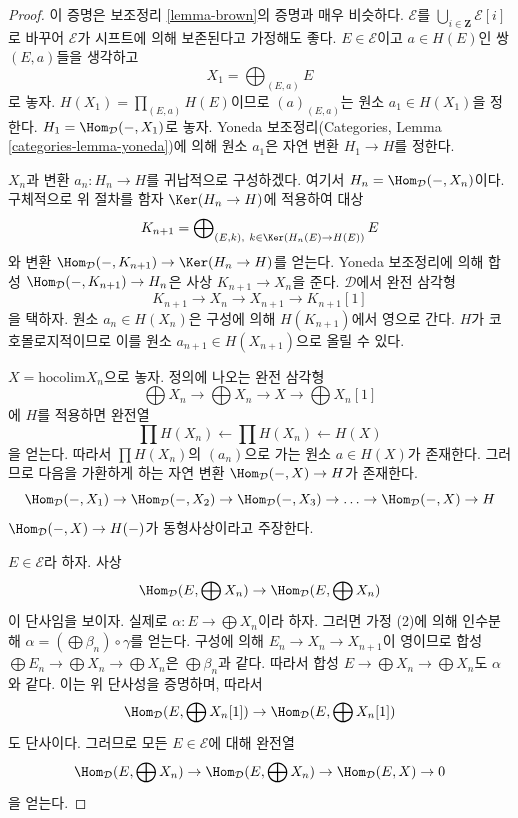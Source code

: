 \begin{proof}
이 증명은 보조정리 \ref{lemma-brown}의 증명과 매우 비슷하다.
$\mathcal{E}$를 $\bigcup_{i \in \mathbf{Z}} \mathcal{E}[i]$로 바꾸어
$\mathcal{E}$가 시프트에 의해 보존된다고 가정해도 좋다.
$E \in \mathcal{E}$이고 $a \in H(E)$인 쌍 $(E, a)$들을 생각하고
$$
X_1 = \bigoplus\nolimits_{(E, a)} E
$$
로 놓자. $H(X_1) = \prod_{(E, a)} H(E)$이므로 $(a)_{(E, a)}$는
원소 $a_1 \in H(X_1)$을 정한다. $H_1 = \Hom_\mathcal{D}(- , X_1)$로
놓자. Yoneda 보조정리(Categories, Lemma
\ref{categories-lemma-yoneda})에 의해 원소 $a_1$은 자연 변환
$H_1 \to H$를 정한다.

\medskip\noindent
$X_n$과 변환 $a_n : H_n \to H$를 귀납적으로 구성하겠다. 여기서
$H_n = \Hom_\mathcal{D}(-, X_n)$이다. 구체적으로 위 절차를 함자
$\Ker(H_n \to H)$에 적용하여 대상
$$
K_{n + 1} = \bigoplus\nolimits_{(E, k),\ k \in \Ker(H_n(E) \to H(E))} E
$$
와 변환 $\Hom_\mathcal{D}(-, K_{n + 1}) \to \Ker(H_n \to H)$를
얻는다. Yoneda 보조정리에 의해 합성
$\Hom_\mathcal{D}(-, K_{n + 1}) \to H_n$은 사상
$K_{n + 1} \to X_n$을 준다. $\mathcal{D}$에서 완전 삼각형
$$
K_{n + 1} \to X_n \to X_{n + 1} \to K_{n + 1}[1]
$$
을 택하자. 원소 $a_n \in H(X_n)$은 구성에 의해 $H(K_{n + 1})$에서
영으로 간다. $H$가 코호몰로지적이므로 이를 원소
$a_{n + 1} \in H(X_{n + 1})$으로 올릴 수 있다.

\medskip\noindent
$X = \text{hocolim} X_n$으로 놓자. 정의에 나오는 완전 삼각형
$$
\bigoplus X_n \to
\bigoplus X_n \to X \to
\bigoplus X_n[1]
$$
에 $H$를 적용하면 완전열
$$
\prod H(X_n) \leftarrow
\prod H(X_n) \leftarrow
H(X)
$$
을 얻는다. 따라서 $\prod H(X_n)$의 $(a_n)$으로 가는 원소
$a \in H(X)$가 존재한다.
그러므로 다음을 가환하게 하는 자연 변환
$\Hom_\mathcal{D}(- , X) \to H$가 존재한다.
$$
\Hom_\mathcal{D}(-, X_1) \to
\Hom_\mathcal{D}(-, X_2) \to
\Hom_\mathcal{D}(-, X_3) \to \ldots \to
\Hom_\mathcal{D}(-, X) \to H
$$
$\Hom_\mathcal{D}(-, X) \to H(-)$가 동형사상이라고 주장한다.

\medskip\noindent
$E \in \mathcal{E}$라 하자. 사상
$$
\Hom_\mathcal{D}(E, \bigoplus X_n) \to  \Hom_\mathcal{D}(E, \bigoplus X_n)
$$
이 단사임을 보이자. 실제로 $\alpha : E \to \bigoplus X_n$이라 하자.
그러면 가정 (2)에 의해 인수분해
$\alpha = (\bigoplus \beta_n) \circ \gamma$를 얻는다. 구성에 의해
$E_n \to X_n \to X_{n + 1}$이 영이므로 합성
$\bigoplus E_n \to \bigoplus X_n \to \bigoplus X_n$은
$\bigoplus \beta_n$과 같다. 따라서 합성
$E \to \bigoplus X_n \to \bigoplus X_n$도 $\alpha$와 같다.
이는 위 단사성을 증명하며, 따라서
$$
\Hom_\mathcal{D}(E, \bigoplus X_n[1]) \to \Hom_\mathcal{D}(E, \bigoplus X_n[1])
$$
도 단사이다. 그러므로 모든 $E \in \mathcal{E}$에 대해 완전열
$$
\Hom_\mathcal{D}(E, \bigoplus X_n) \to
\Hom_\mathcal{D}(E, \bigoplus X_n) \to
\Hom_\mathcal{D}(E, X) \to 0
$$
을 얻는다.


\end{proof}
